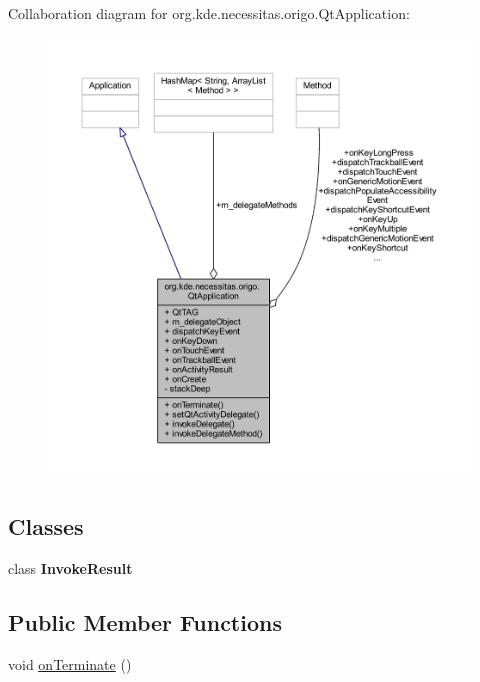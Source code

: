 Collaboration diagram for org.\-kde.\-necessitas.\-origo.\-Qt\-Application\-:\nopagebreak
\begin{figure}[H]
\begin{center}
\leavevmode
\includegraphics[width=350pt]{d8/d74/classorg_1_1kde_1_1necessitas_1_1origo_1_1_qt_application__coll__graph}
\end{center}
\end{figure}
\subsection*{Classes}
\begin{DoxyCompactItemize}
\item 
class {\bfseries Invoke\-Result}
\end{DoxyCompactItemize}
\subsection*{Public Member Functions}
\begin{DoxyCompactItemize}
\item 
void \hyperlink{classorg_1_1kde_1_1necessitas_1_1origo_1_1_qt_application_aeaea892f6a4223f462e6546534718266}{on\-Terminate} ()
\end{DoxyCompactItemize}
